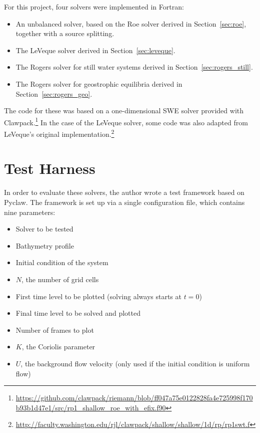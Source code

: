 For this project, four solvers were implemented in Fortran:

\begin{itemize}
  \item An unbalanced solver, based on the Roe solver derived in Section~\ref{sec:roe}, together with a source splitting.
  \item The LeVeque solver derived in Section~\ref{sec:leveque}.
  \item The Rogers solver for still water systems derived in Section~\ref{sec:rogers_still}.
  \item The Rogers solver for geostrophic equilibria derived in Section~\ref{sec:rogers_geo}.
\end{itemize}

The code for these was based on a one-dimensional SWE solver provided with Clawpack.\footnote{\url{https://github.com/clawpack/riemann/blob/ff047a75e0122828fa4e725998f170b93b1d47e1/src/rp1_shallow_roe_with_efix.f90}} In the case of the LeVeque solver, some code was also adapted from LeVeque's original implementation.\footnote{\url{http://faculty.washington.edu/rjl/clawpack/shallow/shallow/1d/rp/rp1swt.f}}

\section{Test Harness}

In order to evaluate these solvers, the author wrote a test framework based on Pyclaw. The framework is set up via a single configuration file, which contains nine parameters:

\begin{itemize}
  \item Solver to be tested
  \item Bathymetry profile
  \item Initial condition of the system
  \item $N$, the number of grid cells
  \item First time level to be plotted (solving always starts at $t = 0$)
  \item Final time level to be solved and plotted
  \item Number of frames to plot
  \item $K$, the Coriolis parameter
  \item $U$, the background flow velocity (only used if the initial condition is uniform flow)
\end{itemize}

